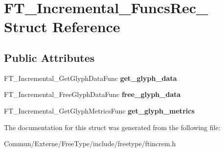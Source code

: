 \hypertarget{struct_f_t___incremental___funcs_rec__}{}\section{F\+T\+\_\+\+Incremental\+\_\+\+Funcs\+Rec\+\_\+ Struct Reference}
\label{struct_f_t___incremental___funcs_rec__}
\subsection*{Public Attributes}
\begin{DoxyCompactItemize}
\item 
F\+T\+\_\+\+Incremental\+\_\+\+Get\+Glyph\+Data\+Func {\bfseries get\+\_\+glyph\+\_\+data}\hypertarget{struct_f_t___incremental___funcs_rec___ac276b7ff9624b8d8bf144ab8d00538b4}{}\label{struct_f_t___incremental___funcs_rec___ac276b7ff9624b8d8bf144ab8d00538b4}

\item 
F\+T\+\_\+\+Incremental\+\_\+\+Free\+Glyph\+Data\+Func {\bfseries free\+\_\+glyph\+\_\+data}\hypertarget{struct_f_t___incremental___funcs_rec___a9201afcfda8c15be839aee04306dff0a}{}\label{struct_f_t___incremental___funcs_rec___a9201afcfda8c15be839aee04306dff0a}

\item 
F\+T\+\_\+\+Incremental\+\_\+\+Get\+Glyph\+Metrics\+Func {\bfseries get\+\_\+glyph\+\_\+metrics}\hypertarget{struct_f_t___incremental___funcs_rec___ac7d95e85357ab9d1893660b0628c1908}{}\label{struct_f_t___incremental___funcs_rec___ac7d95e85357ab9d1893660b0628c1908}

\end{DoxyCompactItemize}


The documentation for this struct was generated from the following file\+:\begin{DoxyCompactItemize}
\item 
Commun/\+Externe/\+Free\+Type/include/freetype/ftincrem.\+h\end{DoxyCompactItemize}
